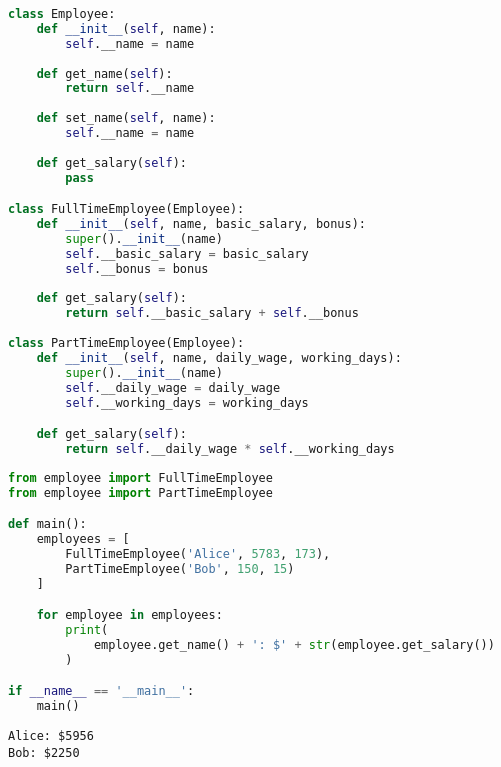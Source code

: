 \begin{lstlisting}[language=Python]
class Employee:
    def __init__(self, name):
        self.__name = name
    
    def get_name(self):
        return self.__name
    
    def set_name(self, name):
        self.__name = name
    
    def get_salary(self):
        pass

class FullTimeEmployee(Employee):
    def __init__(self, name, basic_salary, bonus):
        super().__init__(name)
        self.__basic_salary = basic_salary
        self.__bonus = bonus
    
    def get_salary(self):
        return self.__basic_salary + self.__bonus
    
class PartTimeEmployee(Employee):
    def __init__(self, name, daily_wage, working_days):
        super().__init__(name)
        self.__daily_wage = daily_wage
        self.__working_days = working_days

    def get_salary(self):
        return self.__daily_wage * self.__working_days
\end{lstlisting}

\begin{lstlisting}[language=Python]
from employee import FullTimeEmployee
from employee import PartTimeEmployee

def main():
    employees = [
        FullTimeEmployee('Alice', 5783, 173),
        PartTimeEmployee('Bob', 150, 15)
    ]

    for employee in employees:
        print(
            employee.get_name() + ': $' + str(employee.get_salary())
        )

if __name__ == '__main__':
    main()
\end{lstlisting}

\begin{tcolorbox}
    \begin{verbatim}
Alice: $5956
Bob: $2250
	\end{verbatim}
\end{tcolorbox}

\newpage